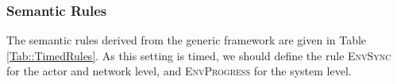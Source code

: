 
\subsubsection{Semantic Rules}
The semantic rules derived from the generic framework are given in Table \ref{Tab::TimedRules}. As this setting is timed, we should define the rule \textsc{EnvSync} for the actor and network level, and \textsc{EnvProgress} for the system level. %



